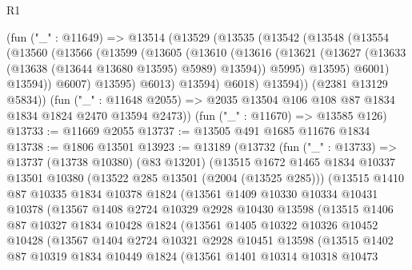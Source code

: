 \begin{lexlean}{R1}
\begin{coremodule}
      (fun ("_" : @11649) =>
      @13514
        (@13529
          (@13535
            (@13542
              (@13548
                (@13554
                  (@13560
                    (@13566
                      (@13599
                        (@13605
                          (@13610
                            (@13616
                              (@13621
                                (@13627 (@13633 (@13638 (@13644 @13680 @13595) @5989) @13594))
                                @5995)
                              @13595)
                            @6001)
                          @13594))
                      @6007)
                    @13595)
                  @6013)
                @13594)
              @6018)
            @13594))
        (@2381 @13129 @5834))
      (fun ("_" : @11648 @2055) => @2035 @13504 @106 @108 @87 @1834 @1834 @1824 @2470 @13594 @2473))
    (fun ("_" : @11670) => @13585 @126)
@13733 := @11669 @2055
@13737 := @13505 @491 @1685 @11676 @1834
@13738 := @1806 @13501
@13923 := @13189
    (@13732
      (fun ("_" : @13733) =>
      @13737
        (@13738 @10380)
        (@83 @13201)
        (@13515
          @1672
          @1465
          @1834
          @10337
          @13501
          @10380
          (@13522 @285 @13501 (@2004 (@13525 @285)))
          (@13515
            @1410
            @87
            @10335
            @1834
            @10378
            @1824
            (@13561
              @1409
              @10330
              @10334
              @10431
              @10378
              (@13567
                @1408
                @2724
                @10329
                @2928
                @10430
                @13598
                (@13515
                  @1406
                  @87
                  @10327
                  @1834
                  @10428
                  @1824
                  (@13561
                    @1405
                    @10322
                    @10326
                    @10452
                    @10428
                    (@13567
                      @1404
                      @2724
                      @10321
                      @2928
                      @10451
                      @13598
                      (@13515
                        @1402
                        @87
                        @10319
                        @1834
                        @10449
                        @1824
                        (@13561
                          @1401
                          @10314
                          @10318
                          @10473

\end{coremodule}
\end{lexlean}
